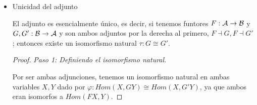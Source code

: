 \documentclass[11pt]{article}
\begin{document}
\begin{itemize}
\begin{itemize}
\begin{proof}
Definimos el isomorfismo y su inversa, que seguimos notando igual,
como:

\[\begin{aligned}
\varphi(f) &= \varepsilon \circ Ff \\
\varphi(g) &= Gg \circ \eta
\end{aligned}\]

Se comprueba trivialmente que es isomorfismo por las condiciones
anteriores. Tenemos así las igualdades:

\[\begin{aligned}
\eta     \circ f        &= \varphi(Ff) \\
g        \circ \epsilon &= \varphi(Gg) \\
\epsilon \circ Ff       &= \varphi(f) \\
Gg       \circ \eta     &= \varphi(g) \\
\end{aligned}\]

\emph{Paso 2: Naturalidad de los isomorfismos.}

Demostraremos que el isomorfismo es natural en cada una de sus
componentes. La naturalidad aquí se deduce de que la definición
de $\varphi$ nos da las siguientes ecuaciones para cualesquiera $f,g,h$:

\[\begin{aligned}
\varphi(f \circ h)   &= Gf \circ \varphi(h) \\
\varphi(h \circ Fg) &= g \circ \varphi(h)
\end{aligned}\]

Que nos dan la naturalidad de $\varphi$ en ambas componentes.
\end{proof}
\end{itemize}

\item Unicidad del adjunto
\label{sec-7-5-1-4}
\begin{theorem}
El adjunto es esencialmente único, es decir,
si tenemos funtores $F : {\cal A} \to {\cal B}$ y $G,G' : {\cal B} \to {\cal A}$ y son ambos adjuntos por la
derecha al primero, $F \dashv G, F \dashv G'$; entonces existe un isomorfismo natural
$\tau : G \cong G'$.
\end{theorem}

\begin{proof}
\emph{Paso 1: Definiendo el isomorfismo natural.}

Por ser ambas adjunciones, tenemos un isomorfismo natural en ambas
variables $X,Y$ dado por $\varphi : Hom(X,GY) \cong Hom(X,G'Y)$, ya que
ambos eran isomorfos a $Hom(FX,Y)$.


\end{proof}
\end{itemize}
\end{document}

